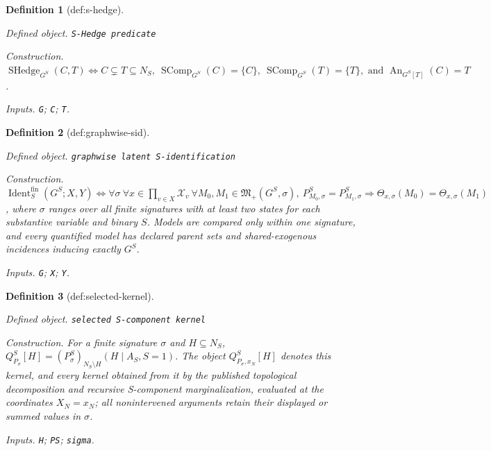 \documentclass{article}
\newtheorem{definition}{Definition}
\begin{document}
\begin{definition}[def:s-hedge]\label{def:s-hedge}
\par\smallskip\noindent\emph{Defined object.} \texttt{S-\allowbreak{}Hedge predicate}
\par\smallskip\noindent\emph{Construction.} \(\operatorname{SHedge}_{G^S}(C,T)\iff C\subsetneq T\subseteq N_S,\ \operatorname{SComp}_{G^S}(C)=\{C\},\ \operatorname{SComp}_{G^S}(T)=\{T\},\text{ and }\operatorname{An}_{G^S[T]}(C)=T\).
\par\smallskip\noindent\emph{Inputs.} \texttt{G}; \texttt{C}; \texttt{T}.
\end{definition}

\begin{definition}[def:graphwise-sid]\label{def:graphwise-sid}
\par\smallskip\noindent\emph{Defined object.} \texttt{graphwise latent S-\allowbreak{}identification}
\par\smallskip\noindent\emph{Construction.} \(\operatorname{Ident}^{\mathrm{fin}}_S(G^S;X,Y)\iff\forall\sigma\ \forall x\in\prod_{v\in X}\mathcal X_v\ \forall M_0,M_1\in\mathfrak M_+(G^S,\sigma),\ P_{M_0,\sigma}^S=P_{M_1,\sigma}^S\Longrightarrow\Theta_{x,\sigma}(M_0)=\Theta_{x,\sigma}(M_1)\), where \(\sigma\) ranges over all finite signatures with at least two states for each substantive variable and binary \(S\). Models are compared only within one signature, and every quantified model has declared parent sets and shared-exogenous incidences inducing exactly \(G^S\).
\par\smallskip\noindent\emph{Inputs.} \texttt{G}; \texttt{X}; \texttt{Y}.
\end{definition}

\begin{definition}[def:selected-kernel]\label{def:selected-kernel}
\par\smallskip\noindent\emph{Defined object.} \texttt{selected S-\allowbreak{}component kernel}
\par\smallskip\noindent\emph{Construction.} For a finite signature \(\sigma\) and \(H\subseteq N_S\), \(Q_{P_\sigma}^S[H]=(P_\sigma^S)_{N_S\setminus H}(H\mid A_S,S=1)\). The object \(Q_{P_\sigma,x_N}^S[H]\) denotes this kernel, and every kernel obtained from it by the published topological decomposition and recursive S-component marginalization, evaluated at the coordinates \(X_N=x_N\); all nonintervened arguments retain their displayed or summed values in \(\sigma\).
\par\smallskip\noindent\emph{Inputs.} \texttt{H}; \texttt{PS}; \texttt{sigma}.
\end{definition}
\end{document}
